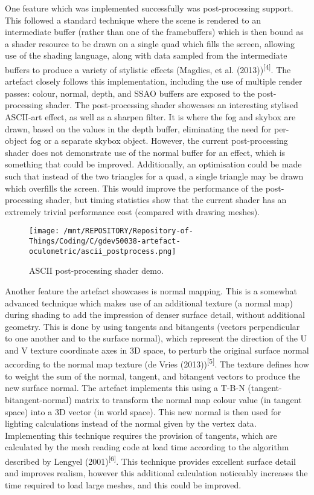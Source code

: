 \documentclass[
]{article}
\begin{document}
{One feature which was implemented successfully was post-processing
support. This followed a standard technique where the scene is rendered
to an intermediate buffer (rather than one of the framebuffers) which is
then bound as a shader resource to be drawn on a single quad which fills
the screen, allowing use of the shading language, along with data
sampled from the intermediate buffers to produce a variety of stylistic
effects (Magdics, et al. (2013))\textsuperscript{{[}4{]}}. The artefact
closely follows this implementation, including the use of multiple
render passes: colour, normal, depth, and SSAO buffers are exposed to
the post-processing shader. The post-processing shader showcases an
interesting stylised ASCII-art effect, as well as a sharpen filter. It
is where the fog and skybox are drawn, based on the values in the depth
buffer, eliminating the need for per-object fog or a separate skybox
object. However, the current post-processing shader does not demonstrate
use of the normal buffer for an effect, which is something that could be
improved. Additionally, an optimisation could be made such that instead
of the two triangles for a quad, a single triangle may be drawn which
overfills the screen. This would improve the performance of the
post-processing shader, but timing statistics show that the current
shader has an extremely trivial performance cost (compared with drawing
meshes).\\
\begin{figure}[H]
\texttt{[image: /mnt/REPOSITORY/Repository-of-Things/Coding/C/gdev50038-artefact-oculometric/ascii\_postprocess.png]}
\caption{\label{fig:figure1} ASCII post-processing shader demo.}
\end{figure}

Another feature the artefact showcases is normal mapping. This is a
somewhat advanced technique which makes use of an additional texture (a
normal map) during shading to add the impression of denser surface
detail, without additional geometry. This is done by using tangents and
bitangents (vectors perpendicular to one another and to the surface
normal), which represent the direction of the U and V texture coordinate
axes in 3D space, to perturb the original surface normal according to
the normal map texture (de Vries (2013))\textsuperscript{{[}5{]}}. The
texture defines how to weight the sum of the normal, tangent, and
bitangent vectors to produce the new surface normal. The artefact
implements this using a T-B-N (tangent-bitangent-normal) matrix to
transform the normal map colour value (in tangent space) into a 3D
vector (in world space). This new normal is then used for lighting
calculations instead of the normal given by the vertex data.
Implementing this technique requires the provision of tangents, which
are calculated by the mesh reading code at load time according to the
algorithm described by Lengyel (2001)\textsuperscript{{[}6{]}}. This
technique provides excellent surface detail and improves realism,
however this additional calculation noticeably increases the time
required to load large meshes, and this could be improved.

}
\end{document}

